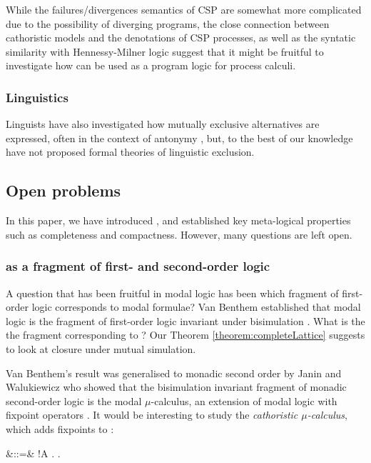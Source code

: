 While the failures/divergences semantics of CSP are somewhat more
complicated due to the possibility of diverging programs, the close
connection between cathoristic models and the denotations of CSP processes,
as well as the syntatic similarity with Hennessy-Milner logic suggest
that it might be fruitful to investigate how \cathoristic{} can be used
as a program logic for process calculi.

\subsubsection{Linguistics}

Linguists have also investigated how mutually exclusive alternatives
are expressed, often in the context of antonymy
\cite{OKeeffeA:rouhanocl,AronoffM:hanlin,AllanK:conencos}, but, to the
best of our knowledge have not proposed formal theories of linguistic
exclusion.

\subsection{Open problems} 

In this paper, we have introduced \cathoristic{}, and established key
meta-logical properties such as completeness and compactness. However,
many questions are left open. 

\subsubsection{\Cathoristic{} as a fragment of first- and second-order logic }

A question that has been fruitful in modal logic has been which
fragment of first-order logic corresponds to modal formulae?  Van
Benthem established that modal logic is the fragment of first-order
logic invariant under bisimulation \cite{BlackburnP:modlog}. What is
the the fragment corresponding to \cathoristic{}? Our Theorem
\ref{theorem:completeLattice} suggests to look at closure under mutual
simulation.  

Van Benthem's result was generalised to monadic second
order by Janin and Walukiewicz \cite{JaninD:expcomotpmcwrtmsol} who
showed that the bisimulation invariant fragment of monadic
second-order logic is the modal $\mu$-calculus, an extension of modal
logic with fixpoint operators \cite{KozenD:respromc}.  It would be
interesting to study the \emph{cathoristic $\mu$-calculus}, which adds
fixpoints to \cathoristic{}:
\begin{GRAMMAR}
  \phi
     &::=&
  \TRUE
     \VERTICAL
  \phi \AND \psi
     \VERTICAL
  \phi
     \VERTICAL
  !A
     \VERTICAL
  \mu {}.\phi
     \VERTICAL
  \nu {}.\phi
     \VERTICAL
\end{GRAMMAR}

